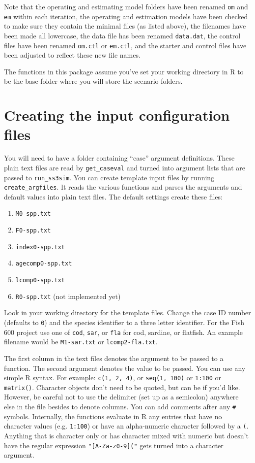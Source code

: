 \documentclass[12pt]{article}
\begin{document}
\noindent
Note that the operating and estimating model folders have been renamed
\texttt{om} and \texttt{em} within each iteration, the operating and estimation 
models have been checked to make sure they contain the minimal files (as listed 
above), the filenames have been made all lowercase, the data file has been 
renamed \texttt{data.dat}, the control files have been renamed \texttt{om.ctl} 
or \texttt{em.ctl}, and the starter and control files have been adjusted to 
reflect these new file names.

The functions in this package assume you've set your working directory in R to 
be the base folder where you will store the scenario folders.

\section*{Creating the input configuration files}
You will need to have a folder containing ``case'' argument definitions. These 
plain text files are read by \texttt{get\_caseval} and turned into argument 
lists that are passed to \texttt{run\_ss3sim}. You can create template input 
files by running \texttt{create\_argfiles}. It reads the various functions and 
parses the arguments and default values into plain text files. The default 
settings create these files:

\begin{enumerate}
  \item \texttt{M0-spp.txt}
  \item \texttt{F0-spp.txt}
  \item \texttt{index0-spp.txt}
  \item \texttt{agecomp0-spp.txt}
  \item \texttt{lcomp0-spp.txt}
  \item \texttt{R0-spp.txt} (not implemented yet)
\end{enumerate}

Look in your working directory for the template files. Change the case ID 
number (defaults to \texttt{0}) and the species identifier to a three letter 
identifier. For the Fish 600 project use one of \texttt{cod}, \texttt{sar}, or 
\texttt{fla} for cod, sardine, or flatfish. An example filename would be 
\texttt{M1-sar.txt} or \texttt{lcomp2-fla.txt}.

The first column in the text files denotes the argument to be passed to a 
function. The second argument denotes the value to be passed. You can use any 
simple R syntax. For example: \texttt{c(1, 2, 4)}, or \texttt{seq(1, 100)} or 
\texttt{1:100} or \texttt{matrix()}. Character objects don't need to be quoted, 
but can be if you'd like. However, be careful not to use the delimiter (set up 
as a semicolon) anywhere else in the file besides to denote columns. You can 
add comments after any \texttt{\#} symbols. Internally, the functions evaluate 
in R any entries that have no character values (e.g. \texttt{1:100}) or have an 
alpha-numeric character followed by a \texttt{(}. Anything that is character 
only or has character mixed with numeric but doesn't have the regular 
expression \texttt{"[A-Za-z0-9]("} gets turned into a character argument.
\end{document}
